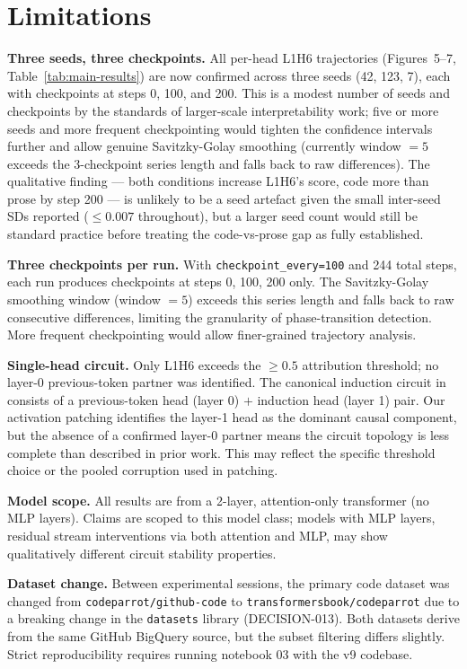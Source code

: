 \section{Limitations}
\label{sec:limitations}

\textbf{Three seeds, three checkpoints.}
All per-head L1H6 trajectories (Figures~5--7, Table~\ref{tab:main-results})
are now confirmed across three seeds (42, 123, 7), each with checkpoints at
steps 0, 100, and 200. This is a modest number of seeds and checkpoints by
the standards of larger-scale interpretability work; five or more seeds and
more frequent checkpointing would tighten the confidence intervals further
and allow genuine Savitzky-Golay smoothing (currently window $=5$ exceeds
the 3-checkpoint series length and falls back to raw differences). The
qualitative finding --- both conditions increase L1H6's score, code more
than prose by step 200 --- is unlikely to be a seed artefact given the
small inter-seed SDs reported ($\leq 0.007$ throughout), but a larger seed
count would still be standard practice before treating the code-vs-prose
gap as fully established.

\textbf{Three checkpoints per run.}
With \texttt{checkpoint\_every=100} and 244 total steps, each run produces
checkpoints at steps 0, 100, 200 only. The Savitzky-Golay smoothing window
(window $= 5$) exceeds this series length and falls back to raw consecutive
differences, limiting the granularity of phase-transition detection. More
frequent checkpointing would allow finer-grained trajectory analysis.

\textbf{Single-head circuit.}
Only L1H6 exceeds the $\geq 0.5$ attribution threshold; no layer-0
previous-token partner was identified. The canonical induction circuit
in \citet{olsson2022context} consists of a previous-token head (layer 0)
$+$ induction head (layer 1) pair. Our activation patching identifies the
layer-1 head as the dominant causal component, but the absence of a
confirmed layer-0 partner means the circuit topology is less complete than
described in prior work. This may reflect the specific threshold choice or
the pooled corruption used in patching.

\textbf{Model scope.}
All results are from a 2-layer, attention-only transformer (no MLP layers).
Claims are scoped to this model class; models with MLP layers, residual
stream interventions via both attention and MLP, may show qualitatively
different circuit stability properties.

\textbf{Dataset change.}
Between experimental sessions, the primary code dataset was changed from
\texttt{codeparrot/github-code} to \texttt{transformersbook/codeparrot}
due to a breaking change in the \texttt{datasets} library (DECISION-013).
Both datasets derive from the same GitHub BigQuery source, but the subset
filtering differs slightly. Strict reproducibility requires running
notebook 03 with the v9 codebase.

